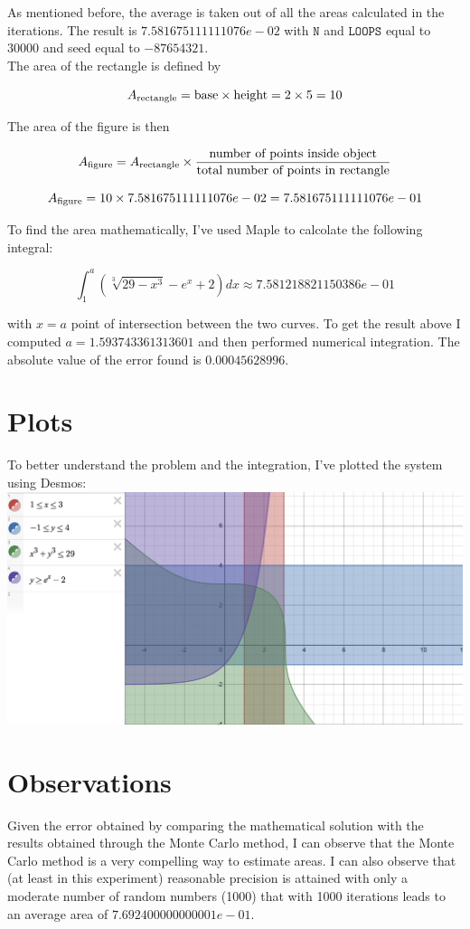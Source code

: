 \documentclass{article}
\newcommand{\code}{\texttt}
\begin{document}
As mentioned before, the average is taken out of all the areas calculated in the iterations. The result is $7.581675111111076e-02$ with $\code{N}$ and $\code{LOOPS}$ equal to 30000 and seed equal to $-87654321$.\\

The area of the rectangle is defined by 

$$A_{\textnormal{rectangle}}= \textnormal{base}\times \textnormal{height}=2\times5=10$$

The area of the figure is then

$$A_{\textnormal{figure}}=A_{\textnormal{rectangle}}\times \frac{\textnormal{number of points inside object}}{\textnormal{total number of points in rectangle}}$$

$$A_{\textnormal{figure}}=10\times 7.581675111111076e-02=7.581675111111076e-01$$

To find the area mathematically, I've used Maple to calcolate the following integral:

$$
\int_1^{a} (\sqrt[3]{29-x^3}-e^x+2)dx\approx 7.581218821150386e-01
$$

with $x=a$ point of intersection between the two curves. To get the result above I computed $a=1.593743361313601$ and then performed numerical integration. The absolute value of the error found is $0.00045628996$.

\section{Plots}
To better understand the problem and the integration, I've plotted the system using Desmos:\\

\includegraphics[width=\textwidth,height=\textheight,keepaspectratio]{desmos.png}
\section{Observations}
Given the error obtained by comparing the mathematical solution with the results obtained through the Monte Carlo method, I can observe that the Monte Carlo method is a very compelling way to estimate areas. I can also observe that (at least in this experiment) reasonable precision is attained with only a moderate number of random numbers (1000) that with 1000 iterations leads to an average area of $7.692400000000001e-01$.
\end{document}
